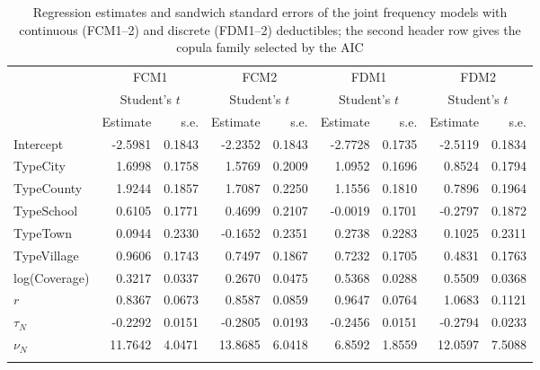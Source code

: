 \documentclass[11pt]{article}
\newcommand{\rev}[1]{{\color{blue}#1}}
\begin{document}
\begin{table}[!h]
\centering
\color{blue}
\begin{tabular}[t]{lrrrrrrrr}
\toprule
\multicolumn{1}{c}{ } & \multicolumn{2}{c}{FCM1} & \multicolumn{2}{c}{FCM2} & \multicolumn{2}{c}{FDM1} & \multicolumn{2}{c}{FDM2} \\
\cmidrule(l{3pt}r{3pt}){2-3} \cmidrule(l{3pt}r{3pt}){4-5} \cmidrule(l{3pt}r{3pt}){6-7} \cmidrule(l{3pt}r{3pt}){8-9}
\multicolumn{1}{c}{ } & \multicolumn{2}{c}{Student's $t$} & \multicolumn{2}{c}{Student's $t$} & \multicolumn{2}{c}{Student's $t$} & \multicolumn{2}{c}{Student's $t$} \\
  & Estimate & s.e. & Estimate & s.e. & Estimate & s.e. & Estimate & s.e.\\
\midrule
Intercept & -2.5981 & 0.1843 & -2.2352 & 0.1843 & -2.7728 & 0.1735 & -2.5119 & 0.1834\\
TypeCity & 1.6998 & 0.1758 & 1.5769 & 0.2009 & 1.0952 & 0.1696 & 0.8524 & 0.1794\\
TypeCounty & 1.9244 & 0.1857 & 1.7087 & 0.2250 & 1.1556 & 0.1810 & 0.7896 & 0.1964\\
TypeSchool & 0.6105 & 0.1771 & 0.4699 & 0.2107 & -0.0019 & 0.1701 & -0.2797 & 0.1872\\
TypeTown & 0.0944 & 0.2330 & -0.1652 & 0.2351 & 0.2738 & 0.2283 & 0.1025 & 0.2311\\
TypeVillage & 0.9606 & 0.1743 & 0.7497 & 0.1867 & 0.7232 & 0.1705 & 0.4831 & 0.1763\\
log(Coverage) & 0.3217 & 0.0337 & 0.2670 & 0.0475 & 0.5368 & 0.0288 & 0.5509 & 0.0368\\
$r$ & 0.8367 & 0.0673 & 0.8587 & 0.0859 & 0.9647 & 0.0764 & 1.0683 & 0.1121\\
$\tau_N$ & -0.2292 & 0.0151 & -0.2805 & 0.0193 & -0.2456 & 0.0151 & -0.2794 & 0.0233\\
$\nu_N$ & 11.7642 & 4.0471 & 13.8685 & 6.0418 & 6.8592 & 1.8559 & 12.0597 & 7.5088\\
\hhline{=========}
\end{tabular}
\caption{Regression estimates \rev{and sandwich standard errors} of the joint frequency models with \rev{continuous (FCM1--2) and discrete (FDM1--2)} deductibles\rev{; the second header row gives the copula family selected by the AIC}}
\label{tab:freqcopularesult}
\end{table}
\end{document}
